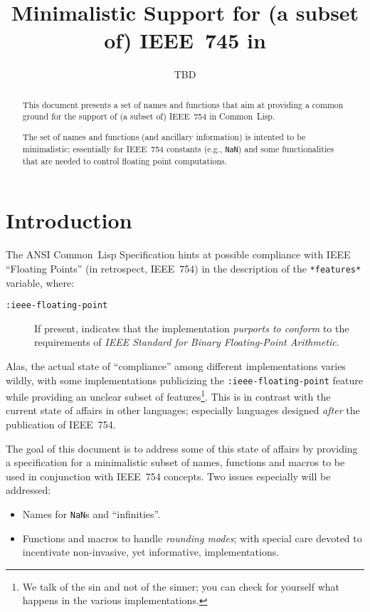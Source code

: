 \documentclass[fleqn]{article}
\title{
\LARGE{\bfseries Minimalistic Support for (a subset of) IEEE~745 in \CL{}}}
\author{TBD}
\newcommand{\CL}{\textsf{Common~Lisp}}
\newcommand{\code}[1]{\texttt{#1}}
\begin{document}
\maketitle

\begin{abstract}
This document presents a set of names and functions that aim at
providing a common ground for the support of (a subset of) IEEE~754 in
\CL{}.

The set of names and functions (and ancillary information) is intented
to be minimalistic; essentially for IEEE~754 constants (e.g.,
\code{NaN}) and some functionalities that are needed to control
floating point computations.
\end{abstract}


\section{Introduction}

The ANSI \CL{} Specification \cite{ANSIHyperSpec} hints at possible
compliance with IEEE ``Floating Points'' (in retrospect, IEEE~754) in
the description of the \code{*features*} variable, where:
\begin{description}
\item[\code{:ieee-floating-point}]
  If present, indicates that the
  implementation \emph{purports to conform}  to the requirements of
  \emph{IEEE Standard for Binary Floating-Point Arithmetic}. 
\end{description}

\noindent
Alas, the actual state of ``compliance'' among different
implementations varies wildly, with some implementations publicizing
the \code{:ieee-floating-point} feature while providing an unclear
subset of features\footnote{We talk of the sin and not of the sinner;
  you can check for yourself what happens in the various
  implementations.}.  This is in contrast with the current state of
affairs in other languages; especially languages designed
\emph{after} the publication of IEEE~754.

\vspace*{3mm}

The goal of this document is to address some of this state of affairs
by providing a specification for a minimalistic subset of names,
functions and macros to be used in conjunction with IEEE~754
concepts.  Two issues especially will 
be addressed:
\begin{itemize}
\item Names for \code{NaN}s and ``infinities''.
\item Functions and macros to handle \emph{rounding modes}; with
  special care devoted to incentivate non-invasive, yet informative,
  implementations.
\end{itemize}
\end{document}
